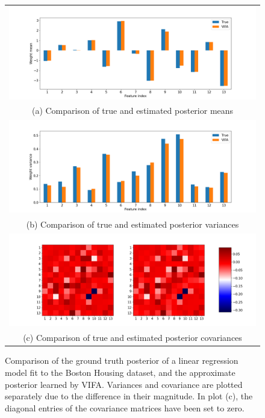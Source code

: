 \documentclass[msc,deptreport.inf]{infthesis} %
\begin{document}
\begin{figure}[!htbp] 
	\begin{tabular}{c}
		\includegraphics[width=140mm]{plots/boston_housing_posterior_mean.png} \\
		(a) Comparison of true and estimated posterior means \\[6pt] 
		 \includegraphics[width=140mm]{plots/boston_housing_posterior_variance.png} \\
		(b) Comparison of true and estimated posterior variances \\[6pt] 
		\includegraphics[width=140mm]{plots/boston_housing_posterior_covariance.png} \\
		(c) Comparison of true and estimated posterior covariances \\[6pt] 
	\end{tabular}
	\caption{Comparison of the ground truth posterior of a linear regression model fit to the Boston Housing dataset, and the approximate posterior learned by VIFA. Variances and covariance are plotted separately due to the difference in their magnitude. In plot (c), the diagonal entries of the covariance matrices have been set to zero.}
	\label{fig:posterior_boston_housing}
\end{figure}
\end{document}
